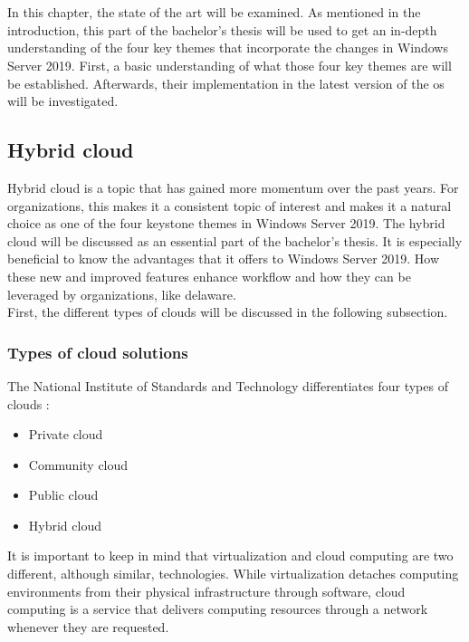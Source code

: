 \chapter{}
\label{ch:stand-van-zaken}
In this chapter, the state of the art will be examined. 
As mentioned in the introduction, this part of the bachelor's thesis will be used to get an in-depth understanding of the four key themes that incorporate the changes in Windows Server 2019. 
First, a basic understanding of what those four key themes are will be established. 
Afterwards, their implementation in the latest version of the \acrshort{os} will be investigated.

\section{Hybrid cloud}
Hybrid cloud is a topic that has gained more momentum over the past years. 
For organizations, this makes it a consistent topic of interest and makes it a natural choice as one of the four keystone themes in Windows Server 2019. \autocite{MWST2018} 
The hybrid cloud will be discussed as an essential part of the bachelor's thesis. 
It is especially beneficial to know the advantages that it offers to Windows Server 2019.
How these new and improved features enhance workflow and how they can be leveraged by organizations, like delaware. \\
First, the different types of clouds will be discussed in the following subsection.

\subsection{Types of cloud solutions}
\label{subsection:typesofcloud}
The National Institute of Standards and Technology differentiates four types of clouds \autocite{Mell2011}:
\begin{itemize}
	\item Private cloud
	\item Community cloud
	\item Public cloud
	\item Hybrid cloud
\end{itemize}	
It is important to keep in mind that virtualization and cloud computing are two different, although similar, technologies. 
While virtualization detaches computing environments from their physical infrastructure through software, cloud computing is a service that delivers computing resources through a network whenever they are requested. \autocite{Naeem2016}

